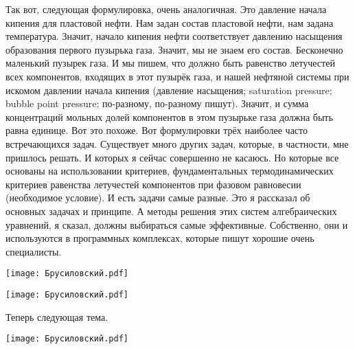 \documentclass[main.tex]{subfiles}
\begin{document}
Так вот, следующая формулировка, очень аналогичная.
Это давление начала кипения для пластовой нефти.
Нам задан состав пластовой нефти, нам задана температура.
Значит, начало кипения нефти соответствует давлению насыщения образования первого пузырька газа.
Значит, мы не знаем его состав.
Бесконечно маленький пузырек газа.
И мы пишем, что должно быть равенство летучестей всех компонентов, входящих в этот пузырёк газа, и нашей нефтяной системы при искомом давлении начала кипения (давление насыщения; saturation pressure; bubble point pressure; по-разному, по-разному пишут).
Значит, и сумма концентраций мольных долей компонентов в этом пузырьке газа должна быть равна единице.
Вот это похоже.
Вот формулировки трёх наиболее часто встречающихся задач.
Существует много других задач, которые, в частности, мне пришлось решать.
И которых я сейчас совершенно не касаюсь.
Но которые все основаны на использовании критериев, фундаментальных термодинамических критериев равенства летучестей компонентов при фазовом равновесии (необходимое условие).
И есть задачи самые разные.
Это я рассказал об основных задачах и принципе.
А методы решения этих систем алгебраических уравнений, я сказал, должны выбираться самые эффективные.
Собственно, они и используются в программных комплексах, которые пишут хорошие очень специалисты.

\begin{center}
\texttt{[image: Брусиловский.pdf]}
\end{center}



\begin{center}
\texttt{[image: Брусиловский.pdf]}
\end{center}

Теперь следующая тема.

\begin{center}
\texttt{[image: Брусиловский.pdf]}
\end{center}
\end{document}
